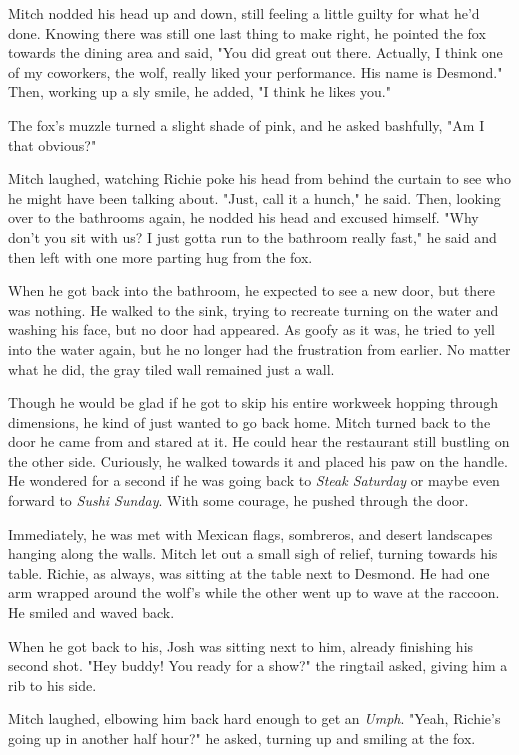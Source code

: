 Mitch nodded his head up and down, still feeling a little guilty for what he'd done. Knowing there was still one last thing to make right, he pointed the fox towards the dining area and said, "You did great out there. Actually, I think one of my coworkers, the wolf, really liked your performance. His name is Desmond." Then, working up a sly smile, he added, "I think he likes you."

The fox's muzzle turned a slight shade of pink, and he asked bashfully, "Am I that obvious?"

Mitch laughed, watching Richie poke his head from behind the curtain to see who he might have been talking about. "Just, call it a hunch," he said. Then, looking over to the bathrooms again, he nodded his head and excused himself. "Why don't you sit with us? I just gotta run to the bathroom really fast," he said and then left with one more parting hug from the fox.

When he got back into the bathroom, he expected to see a new door, but there was nothing. He walked to the sink, trying to recreate turning on the water and washing his face, but no door had appeared. As goofy as it was, he tried to yell into the water again, but he no longer had the frustration from earlier. No matter what he did, the gray tiled wall remained just a wall.

Though he would be glad if he got to skip his entire workweek hopping through dimensions, he kind of just wanted to go back home. Mitch turned back to the door he came from and stared at it. He could hear the restaurant still bustling on the other side. Curiously, he walked towards it and placed his paw on the handle. He wondered for a second if he was going back to \emph{Steak Saturday} or maybe even forward to \emph{Sushi Sunday}. With some courage, he pushed through the door.

Immediately, he was met with Mexican flags, sombreros, and desert landscapes hanging along the walls. Mitch let out a small sigh of relief, turning towards his table. Richie, as always, was sitting at the table next to Desmond. He had one arm wrapped around the wolf's while the other went up to wave at the raccoon. He smiled and waved back.

When he got back to his, Josh was sitting next to him, already finishing his second shot. "Hey buddy! You ready for a show?" the ringtail asked, giving him a rib to his side.

Mitch laughed, elbowing him back hard enough to get an \emph{Umph}. "Yeah, Richie's going up in another half hour?" he asked, turning up and smiling at the fox.

